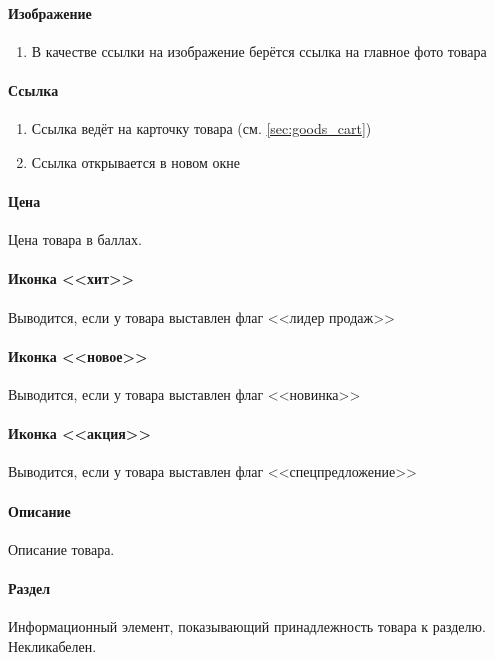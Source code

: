                 \paragraph{Изображение}
                    \begin{enumerate}
                        \item В качестве ссылки на изображение берётся ссылка на главное фото товара
                    \end{enumerate}
                \paragraph{Ссылка}
                    \begin{enumerate}
                        \item Ссылка ведёт на карточку товара (см. \ref{sec:goods_cart})
                        \item Ссылка открывается в новом окне
                    \end{enumerate}
                \paragraph{Цена}
                    Цена товара в баллах.
                \paragraph{Иконка <<хит>>}
                    Выводится, если у товара выставлен флаг <<лидер продаж>>
                \paragraph{Иконка <<новое>>}
                    Выводится, если у товара выставлен флаг <<новинка>>
                \paragraph{Иконка <<акция>>}
                    Выводится, если у товара выставлен флаг <<спецпредложение>>
                \paragraph{Описание}
                    Описание товара.
                \paragraph{Раздел}
                    Информационный элемент, показывающий принадлежность товара к разделю.
                    Некликабелен.
